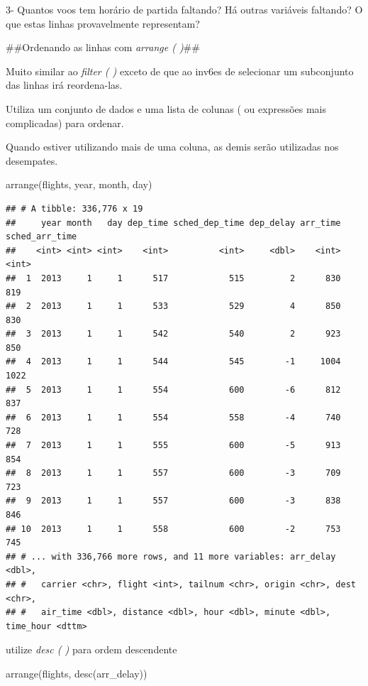 \documentclass[
]{article}
\newenvironment{Shaded}{\begin{snugshade}}{\end{snugshade}}
\newcommand{\FunctionTok}[1]{\textcolor[rgb]{0.00,0.00,0.00}{#1}}
\newcommand{\NormalTok}[1]{#1}
\begin{document}
3- Quantos voos tem horário de partida faltando? Há outras variáveis
faltando? O que estas linhas provavelmente representam?

\#\#Ordenando as linhas com \emph{arrange ( )}\#\#

Muito similar ao \emph{filter ( )} exceto de que ao inv6es de selecionar
um subconjunto das linhas irá reordena-las.

Utiliza um conjunto de dados e uma lista de colunas ( ou expressões mais
complicadas) para ordenar.

Quando estiver utilizando mais de uma coluna, as demis serão utilizadas
nos desempates.

\begin{Shaded}
\begin{Highlighting}[]
\FunctionTok{arrange}\NormalTok{(flights, year, month, day)}
\end{Highlighting}
\end{Shaded}

\begin{verbatim}
## # A tibble: 336,776 x 19
##     year month   day dep_time sched_dep_time dep_delay arr_time sched_arr_time
##    <int> <int> <int>    <int>          <int>     <dbl>    <int>          <int>
##  1  2013     1     1      517            515         2      830            819
##  2  2013     1     1      533            529         4      850            830
##  3  2013     1     1      542            540         2      923            850
##  4  2013     1     1      544            545        -1     1004           1022
##  5  2013     1     1      554            600        -6      812            837
##  6  2013     1     1      554            558        -4      740            728
##  7  2013     1     1      555            600        -5      913            854
##  8  2013     1     1      557            600        -3      709            723
##  9  2013     1     1      557            600        -3      838            846
## 10  2013     1     1      558            600        -2      753            745
## # ... with 336,766 more rows, and 11 more variables: arr_delay <dbl>,
## #   carrier <chr>, flight <int>, tailnum <chr>, origin <chr>, dest <chr>,
## #   air_time <dbl>, distance <dbl>, hour <dbl>, minute <dbl>, time_hour <dttm>
\end{verbatim}

utilize \emph{desc ( )} para ordem descendente

\begin{Shaded}
\begin{Highlighting}[]
\FunctionTok{arrange}\NormalTok{(flights, }\FunctionTok{desc}\NormalTok{(arr\_delay))}
\end{Highlighting}
\end{Shaded}
\end{document}
